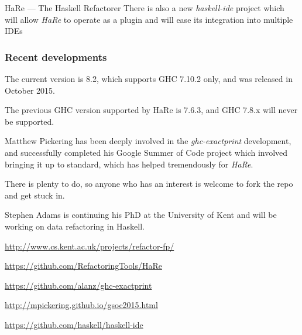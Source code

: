\documentclass[DIV16,twocolumn,10pt]{scrreprt}
\begin{document}
\begin{hcarentry}[updated]{HaRe --- The Haskell Refactorer}
There is also a new \emph{haskell-ide} project which will allow \emph{HaRe} to operate
as a plugin and will ease its integration into multiple IDEs 

\subsubsection*{Recent developments}
\begin{compactitem}

\item The current version is 8.2, which supports GHC 7.10.2 only, and was
  released in October 2015.

\item The previous GHC version supported by HaRe is 7.6.3, and GHC 7.8.x will
  never be supported.

\item Matthew Pickering has been deeply involved in the \emph{ghc-exactprint}
  development, and successfully completed his Google Summer of Code project
  which involved bringing it up to standard, which has helped tremendously for
  \emph{HaRe}.

\item There is plenty to do, so anyone who has an interest is welcome
  to fork the repo and get stuck in.

\item Stephen Adams is continuing his PhD at the University of Kent and
  will be working on data refactoring in Haskell.
\end{compactitem}

\FurtherReading
\begin{compactitem}
\item \url{http://www.cs.kent.ac.uk/projects/refactor-fp/}
\item \url{https://github.com/RefactoringTools/HaRe}
\item \url{https://github.com/alanz/ghc-exactprint}
\item \url{http://mpickering.github.io/gsoc2015.html}
\item \url{https://github.com/haskell/haskell-ide}
\end{compactitem}
\end{hcarentry}
\end{document}
